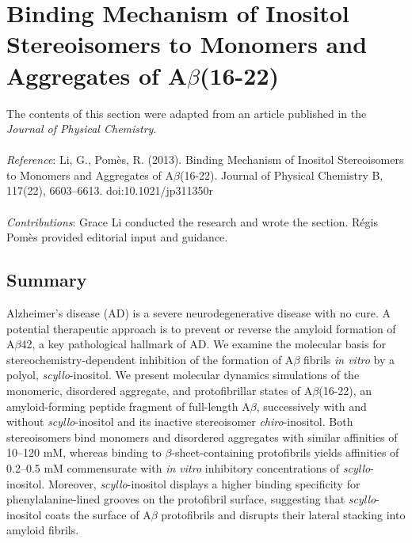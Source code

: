 \chapter[Molecular Mechanism of Amyloid Inhibition by Inositol]
{Binding Mechanism of Inositol Stereoisomers to Monomers and Aggregates of A$\beta$(16-22)}

The contents of this section were adapted from an article published in the \emph{Journal of Physical Chemistry}.
\\
\\
\emph{Reference}:
Li, G., Pomès, R. (2013). Binding Mechanism of Inositol Stereoisomers to Monomers and Aggregates of A$\beta$(16-22). Journal of Physical Chemistry B, 117(22), 6603–6613. doi:10.1021/jp311350r
\\
\\
\emph{Contributions}:
Grace Li conducted the research and wrote the section. R\'{e}gis Pom\`{e}s provided editorial input and guidance.

\newpage

\section{Summary}
Alzheimer's disease (AD) is a severe neurodegenerative disease with no cure. A potential therapeutic approach is to prevent or reverse the amyloid formation of A$\beta$42, a key pathological hallmark of AD. We examine the molecular basis for stereochemistry-dependent inhibition of the formation of A$\beta$ fibrils \emph{in vitro} by a polyol,  \emph{scyllo}-inositol. We present molecular dynamics simulations of the monomeric, disordered aggregate, and protofibrillar states of A$\beta$(16-22), an amyloid-forming peptide fragment of full-length A$\beta$, successively with and without \emph{scyllo}-inositol and its inactive stereoisomer \emph{chiro}-inositol. Both stereoisomers bind monomers and disordered aggregates with similar affinities of 10--120 mM, whereas binding to $\beta$-sheet-containing protofibrils yields affinities of 0.2--0.5 mM commensurate with \emph{in vitro} inhibitory concentrations of \emph{scyllo}-inositol. Moreover,  \emph{scyllo}-inositol displays a higher binding specificity for phenylalanine-lined grooves on the protofibril surface, suggesting that  \emph{scyllo}-inositol coats the surface of A$\beta$ protofibrils and disrupts their lateral stacking into amyloid fibrils.\\

